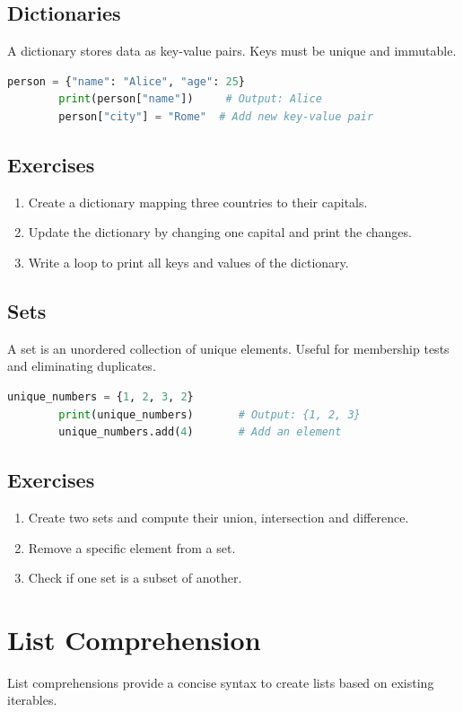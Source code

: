 \documentclass[a4paper,11pt]{article}
\begin{document}
	\subsection{Dictionaries}
	A dictionary stores data as key-value pairs. Keys must be unique and immutable.
	
	\begin{lstlisting}[language=Python]
		person = {"name": "Alice", "age": 25}
		print(person["name"])     # Output: Alice
		person["city"] = "Rome"  # Add new key-value pair
	\end{lstlisting}
	
	\subsection*{Exercises}
	\begin{enumerate}
		\item Create a dictionary mapping three countries to their capitals.
		\item Update the dictionary by changing one capital and print the changes.
		\item Write a loop to print all keys and values of the dictionary.
	\end{enumerate}
	
	\subsection{Sets}
	A set is an unordered collection of unique elements. Useful for membership tests and eliminating duplicates.
	
	\begin{lstlisting}[language=Python]
		unique_numbers = {1, 2, 3, 2}
		print(unique_numbers)       # Output: {1, 2, 3}
		unique_numbers.add(4)       # Add an element
	\end{lstlisting}
	
	\subsection*{Exercises}
	\begin{enumerate}
		\item Create two sets and compute their union, intersection and difference.
		\item Remove a specific element from a set.
		\item Check if one set is a subset of another.
	\end{enumerate}
	
	\section{List Comprehension}
	List comprehensions provide a concise syntax to create lists based on existing iterables.
	
\end{document}
